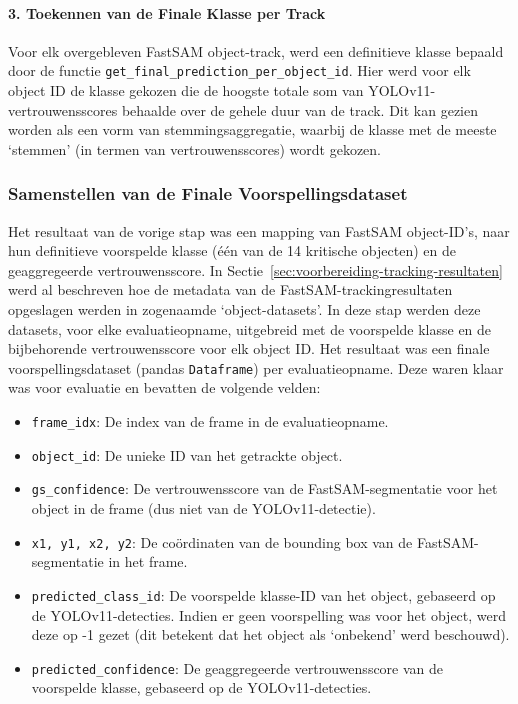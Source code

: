 \paragraph{3. Toekennen van de Finale Klasse per Track}
Voor elk overgebleven FastSAM object-track, werd een definitieve klasse bepaald door de functie \texttt{get\_final\_prediction\_per\_object\_id}. 
Hier werd voor elk object ID de klasse gekozen die de hoogste totale som van YOLOv11-vertrouwensscores 
behaalde over de gehele duur van de track. 
Dit kan gezien worden als een vorm van stemmingsaggregatie, 
waarbij de klasse met de meeste `stemmen' (in termen van vertrouwensscores) wordt gekozen.

\subsubsection{Samenstellen van de Finale Voorspellingsdataset}
Het resultaat van de vorige stap was een mapping van FastSAM object-ID's, 
naar hun definitieve voorspelde klasse (één van de 14 kritische objecten) 
en de geaggregeerde vertrouwensscore.
In Sectie~\ref{sec:voorbereiding-tracking-resultaten} werd al beschreven hoe de metadata van de FastSAM-trackingresultaten opgeslagen werden in zogenaamde `object-datasets'.
In deze stap werden deze datasets, voor elke evaluatieopname, uitgebreid met de voorspelde klasse en de bijbehorende vertrouwensscore voor elk object ID.
Het resultaat was een finale voorspellingsdataset (pandas \texttt{Dataframe}) per evaluatieopname. Deze waren klaar was voor evaluatie en bevatten de volgende velden:
\begin{itemize}
    \item \texttt{frame\_idx}: De index van de frame in de evaluatieopname.
    \item \texttt{object\_id}: De unieke ID van het getrackte object.
    \item \texttt{gs\_confidence}: De vertrouwensscore van de FastSAM-segmentatie voor het object in de frame (dus niet van de YOLOv11-detectie).
    \item \texttt{x1, y1, x2, y2}: De coördinaten van de bounding box van de FastSAM-segmentatie in het frame.
    \item \texttt{predicted\_class\_id}: De voorspelde klasse-ID van het object, gebaseerd op de YOLOv11-detecties.
    Indien er geen voorspelling was voor het object, werd deze op -1 gezet (dit betekent dat het object als `onbekend' werd beschouwd).
    \item \texttt{predicted\_confidence}: De geaggregeerde vertrouwensscore van de voorspelde klasse, gebaseerd op de YOLOv11-detecties.
\end{itemize}

